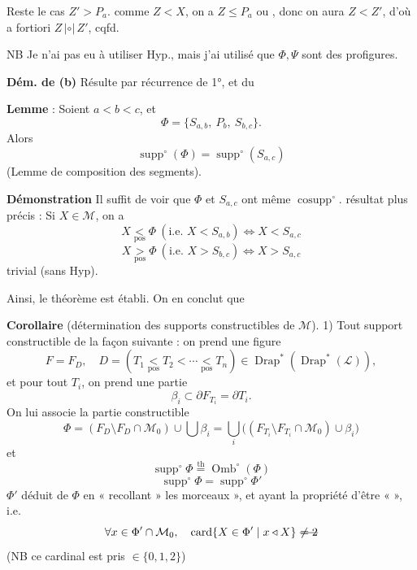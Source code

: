 \documentclass[11pt,a4paper]{article}
\begin{document}

Reste le cas  $Z' > P_a$.  comme $Z<X$, on a $Z\leq P_a$ ou , donc on aura $Z<Z'$, d'où a fortiori $Z\,|{\circ}|\,Z'$, cqfd.

NB Je n'ai pas eu à utiliser Hyp.,  mais \struck{\ill{}} j'ai utilisé  que $\Phi,\Psi$ sont des profigures.

\textbf{Dém. de (b)} Résulte par récurrence  de 1°, \struck{\ill{}} et du

\textbf{Lemme} : Soient $a<b<c$, et
\[ \Phi = \{S_{a,b},\ P_b,\ S_{b,c}\} . \]
Alors
\[ \operatorname{supp}^\circ(\Phi) = \operatorname{supp}^\circ(S_{a,c}) \]
(Lemme de composition des segments).

\textbf{Démonstration} Il suffit de voir que $\Phi$ et $S_{a,c}$ ont même $\operatorname{cosupp}^\circ$.    résultat plus précis : Si $X\in\mathcal{M}$, on a
\[ X \underset{\mathrm{pos}}{<} \Phi \ (\text{i.e. } X<S_{a,b}) \iff X<S_{a,c} \]
\[ X \underset{\mathrm{pos}}{>} \Phi \ (\text{i.e. } X>S_{b,c}) \iff X>S_{a,c} \]
trivial (sans Hyp).

Ainsi, le théorème est établi. On en conclut que 

\textbf{Corollaire} (détermination des supports constructibles de $\mathcal{M}$). 
1) Tout support constructible  de la façon suivante : on prend une \struck{\ill{}} figure
\[ F = F_D, \quad D = (T_1 \underset{\mathrm{pos}}{<} T_2 < \cdots \underset{\mathrm{pos}}{<} T_n) \in \operatorname{Drap}^*(\operatorname{Drap}^*(\mathcal{L})), \]
et pour tout $T_i$, on prend une partie
\[ \beta_i \subset \partial F_{T_i} = \partial T_i . \]
\struck{\ill{}} On lui associe la partie constructible
\[ \Phi = (F_D\setminus F_D\cap\mathcal{M}_0)\cup\bigcup\beta_i
= \bigcup_i\big((F_{T_i}\setminus F_{T_i}\cap\mathcal{M}_0)\cup\beta_i\big) \]
et
\[ \operatorname{supp}^\circ\Phi \overset{\text{th}}{=} \operatorname{Omb}^\circ(\Phi) \]
\[ \operatorname{supp}^\circ\Phi = \operatorname{supp}^\circ\Phi' \]
$\Phi'$ déduit de $\Phi$ en « recollant » les morceaux », et ayant la propriété d'être «  », i.e.
\[ \forall x\in\Phi'\cap\mathcal{M}_0, \quad \operatorname{card}\{X\in\Phi' \mid x\triangleleft X\}\ \text{\struck{$\neq 2$}} \]
(NB ce cardinal est pris $\in\{0,1,2\}$)
\end{document}
